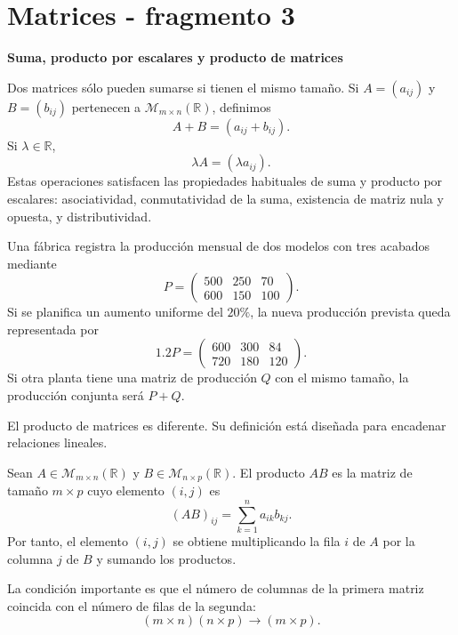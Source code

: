 \section{Matrices - fragmento 3}
\textbf{Suma, producto por escalares y producto de matrices}

Dos matrices sólo pueden sumarse si tienen el mismo tamaño. Si $A=(a_{ij})$ y $B=(b_{ij})$ pertenecen a $\mathcal M_{m\times n}(\mathbb{R})$, definimos
\[
A+B=(a_{ij}+b_{ij}).
\]
Si $\lambda\in\mathbb{R}$,
\[
\lambda A=(\lambda a_{ij}).
\]
Estas operaciones satisfacen las propiedades habituales de suma y producto por escalares: asociatividad, conmutatividad de la suma, existencia de matriz nula y opuesta, y distributividad.

\begin{example}
Una fábrica registra la producción mensual de dos modelos con tres acabados mediante
\[
P=
\begin{pmatrix}
500&250&70\\
600&150&100
\end{pmatrix}.
\]
Si se planifica un aumento uniforme del $20\%$, la nueva producción prevista queda representada por
\[
1.2P=
\begin{pmatrix}
600&300&84\\
720&180&120
\end{pmatrix}.
\]
Si otra planta tiene una matriz de producción $Q$ con el mismo tamaño, la producción conjunta será $P+Q$.
\end{example}

El producto de matrices es diferente. Su definición está diseñada para encadenar relaciones lineales.

\begin{definition}
Sean $A\in\mathcal M_{m\times n}(\mathbb{R})$ y $B\in\mathcal M_{n\times p}(\mathbb{R})$. El producto $AB$ es la matriz de tamaño $m\times p$ cuyo elemento $(i,j)$ es
\[
(AB)_{ij}=\sum_{k=1}^{n}a_{ik}b_{kj}.
\]
Por tanto, el elemento $(i,j)$ se obtiene multiplicando la fila $i$ de $A$ por la columna $j$ de $B$ y sumando los productos.
\end{definition}

La condición importante es que el número de columnas de la primera matriz coincida con el número de filas de la segunda:
\[
(m\times n)(n\times p)\longrightarrow(m\times p).
\]


